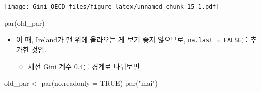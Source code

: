 \documentclass[
]{article}
\newenvironment{Shaded}{\begin{snugshade}}{\end{snugshade}}
\newcommand{\AttributeTok}[1]{\textcolor[rgb]{0.77,0.63,0.00}{#1}}
\newcommand{\ConstantTok}[1]{\textcolor[rgb]{0.00,0.00,0.00}{#1}}
\newcommand{\DecValTok}[1]{\textcolor[rgb]{0.00,0.00,0.81}{#1}}
\newcommand{\FloatTok}[1]{\textcolor[rgb]{0.00,0.00,0.81}{#1}}
\newcommand{\FunctionTok}[1]{\textcolor[rgb]{0.00,0.00,0.00}{#1}}
\newcommand{\NormalTok}[1]{#1}
\newcommand{\OtherTok}[1]{\textcolor[rgb]{0.56,0.35,0.01}{#1}}
\newcommand{\SpecialCharTok}[1]{\textcolor[rgb]{0.00,0.00,0.00}{#1}}
\newcommand{\StringTok}[1]{\textcolor[rgb]{0.31,0.60,0.02}{#1}}
\providecommand{\tightlist}{%
  \setlength{\itemsep}{0pt}\setlength{\parskip}{0pt}}
\begin{document}
\begin{Shaded}
\end{Shaded}

\texttt{[image: Gini\_OECD\_files/figure-latex/unnamed-chunk-15-1.pdf]}

\begin{Shaded}
\begin{Highlighting}[]
\FunctionTok{par}\NormalTok{(old\_par)}
\end{Highlighting}
\end{Shaded}

\begin{itemize}
\tightlist
\item
  이 때, Ireland가 맨 위에 올라오는 게 보기 좋지 않으므로,
  \texttt{na.last\ =\ FALSE}를 추가한 것임.

  \begin{itemize}
  \tightlist
  \item
    세전 Gini 계수 0.4를 경계로 나눠보면
  \end{itemize}
\end{itemize}

\begin{Shaded}
\begin{Highlighting}[]
\NormalTok{old\_par }\OtherTok{\textless{}{-}} \FunctionTok{par}\NormalTok{(}\AttributeTok{no.readonly =} \ConstantTok{TRUE}\NormalTok{)}
\FunctionTok{par}\NormalTok{(}\StringTok{"mai"}\NormalTok{)}
\end{Highlighting}
\end{Shaded}
\end{document}
